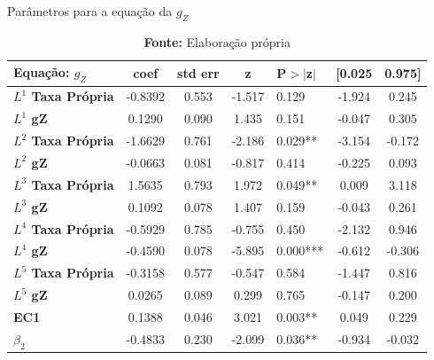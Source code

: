 	\begin{table}[htb]
		\begin{center}
		\caption{Parâmetros para a equação da $g_Z$}	
	\begin{tabular}{lccclcc}
		\toprule
		\textbf{Equação:} $g_Z$ & \textbf{coef} & \textbf{std err} & \textbf{z} & \textbf{P$> |$z$|$} & \textbf{[0.025} & \textbf{0.975]}  \\
		\midrule
		\textbf{$L^1 $ Taxa Própria} &      -0.8392  &        0.553     &    -1.517  &         0.129        &       -1.924    &        0.245     \\
		\textbf{$L^1 $ gZ}           &       0.1290  &        0.090     &     1.435  &         0.151        &       -0.047    &        0.305     \\
		\textbf{$L^2 $ Taxa Própria} &      -1.6629  &        0.761     &    -2.186  &         0.029**        &       -3.154    &       -0.172     \\
		\textbf{$L^2 $ gZ}           &      -0.0663  &        0.081     &    -0.817  &         0.414        &       -0.225    &        0.093     \\
		\textbf{$L^3 $ Taxa Própria} &       1.5635  &        0.793     &     1.972  &         0.049**        &        0.009    &        3.118     \\
		\textbf{$L^3 $ gZ}           &       0.1092  &        0.078     &     1.407  &         0.159        &       -0.043    &        0.261     \\
		\textbf{$L^4 $ Taxa Própria} &      -0.5929  &        0.785     &    -0.755  &         0.450        &       -2.132    &        0.946     \\
		\textbf{$L^4 $ gZ}           &      -0.4590  &        0.078     &    -5.895  &         0.000***        &       -0.612    &       -0.306     \\
		\textbf{$L^5 $ Taxa Própria} &      -0.3158  &        0.577     &    -0.547  &         0.584        &       -1.447    &        0.816     \\
		\textbf{$L^5 $ gZ}           &       0.0265  &        0.089     &     0.299  &         0.765        &       -0.147    &        0.200     \\
		\textbf{EC1} &       0.1388  &        0.046     &     3.021  &         0.003**        &        0.049    &        0.229     \\
		\textbf{$\beta_2$ } &      -0.4833  &        0.230     &    -2.099  &         0.036**        &       -0.934    &       -0.032     \\\bottomrule
	\end{tabular}
\caption*{\textbf{Fonte:} Elaboração própria}
\end{center}
\end{table}
